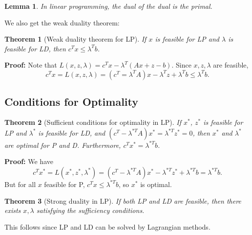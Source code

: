 \documentclass[12pt]{article}
\newtheorem{theorem}{Theorem}[section]
\newtheorem{lemma}{Lemma}[section]
\theoremstyle{definition}
\theoremstyle{remark}
\begin{document}
\begin{lemma}
	In linear programming, the dual of the dual is the primal.
\end{lemma}

We also get the weak duality theorem:

\begin{theorem}[Weak duality theorem for LP]
	If $x$ is feasible for LP and $\lambda$ is feasible for LD, then $c^{T}x \leq \lambda^{T}b$.
\end{theorem}

\begin{adjustbox}{minipage = \columnwidth - 25.5pt, margin=1em, frame=1pt, margin=0em}
	\textbf{Proof:} Note that $L(x, z, \lambda) = c^{T}x - \lambda^{T}(Ax + z - b)$. Since $x, z, \lambda$ are feasible,
	\[
		c^{T}x = L(x, z, \lambda) = (c^{T} = \lambda^{T}A)x - \lambda^{T}z + \lambda^{T}b \leq \lambda^{T}b
	.\]
\end{adjustbox}

\subsection{Conditions for Optimality}%
\label{sub:conditions_for_optimality}

\begin{theorem}[Sufficient conditions for optimality in LP]
	If $x^{\ast}$, $z^{\ast}$ is feasible for LP and $\lambda^{\ast}$ is feasible for LD, and $(c^{T} - \lambda^{\ast T}A)x^{\ast} = \lambda^{\ast T}z^{\ast} = 0$, then $x^{\ast}$ and $\lambda^{\ast}$ are optimal for P and D. Furthermore, $c^{T}x^{\ast} = \lambda^{\ast T}b$.
\end{theorem}

\begin{adjustbox}{minipage = \columnwidth - 25.5pt, margin=1em, frame=1pt, margin=0em}
\textbf{Proof:} We have
\[
	c^{T}x^{\ast} = L(x^{\ast}, z^{\ast}, \lambda^{\ast}) = (c^{T} - \lambda^{\ast T}A)x^{\ast} - \lambda^{\ast T}z^{\ast} + \lambda^{\ast T} b = \lambda^{\ast T}b
.\]
But for all $x$ feasible for P, $c^{T}x \leq \lambda^{\ast T}b$, so $x^{\ast}$ is optimal.
\end{adjustbox}

\begin{theorem}[Strong duality in LP]
	If both LP and LD are feasible, then there exists $x, \lambda$ satisfying the sufficiency conditions.
\end{theorem}

This follows since LP and LD can be solved by Lagrangian methods.
\end{document}
